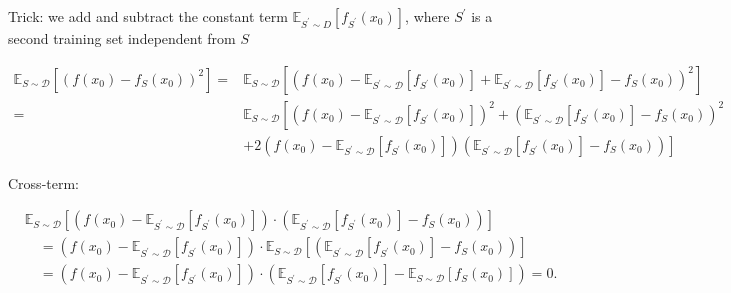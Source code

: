 Trick: we add and subtract the constant term $\mathbb{E}_{S^{\prime} \sim D}\left[f_{S^{\prime}}\left(x_{0}\right)\right]$, where $S^{\prime}$ is a second training set independent from $S$

$$
\begin{aligned}
\mathbb{E}_{S \sim \mathscr{D}}\left[\left(f\left(x_{0}\right)-f_{S}\left(x_{0}\right)\right)^{2}\right]= & \mathbb{E}_{S \sim \mathscr{D}}\left[\left(f\left(x_{0}\right)-\mathbb{E}_{S^{\prime} \sim \mathscr{D}}\left[f_{S^{\prime}}\left(x_{0}\right)\right]+\mathbb{E}_{S^{\prime} \sim \mathscr{D}}\left[f_{S^{\prime}}\left(x_{0}\right)\right]-f_{S}\left(x_{0}\right)\right)^{2}\right] \\
= & \mathbb{E}_{S \sim \mathscr{D}}\left[\left(f\left(x_{0}\right)-\mathbb{E}_{S^{\prime} \sim \mathcal{D}}\left[f_{S^{\prime}}\left(x_{0}\right)\right]\right)^{2}+\left(\mathbb{E}_{S^{\prime} \sim \mathscr{D}}\left[f_{S^{\prime}}\left(x_{0}\right)\right]-f_{S}\left(x_{0}\right)\right)^{2}\right. \\
& \left.+2\left(f\left(x_{0}\right)-\mathbb{E}_{S^{\prime} \sim \mathscr{D}}\left[f_{S^{\prime}}\left(x_{0}\right)\right]\right)\left(\mathbb{E}_{S^{\prime} \sim \mathscr{D}}\left[f_{S^{\prime}}\left(x_{0}\right)\right]-f_{S}\left(x_{0}\right)\right)\right]
\end{aligned}
$$

Cross-term:

$$
\begin{aligned}
& \mathbb{E}_{S \sim \mathscr{D}} {\left[\left(f\left(x_{0}\right)-\mathbb{E}_{S^{\prime} \sim \mathscr{D}}\left[f_{S^{\prime}}\left(x_{0}\right)\right]\right) \cdot\left(\mathbb{E}_{S^{\prime} \sim \mathscr{D}}\left[f_{S^{\prime}}\left(x_{0}\right)\right]-f_{S}\left(x_{0}\right)\right)\right] } \\
& \quad=\left(f\left(x_{0}\right)-\mathbb{E}_{S^{\prime} \sim \mathscr{D}}\left[f_{S^{\prime}}\left(x_{0}\right)\right]\right) \cdot \mathbb{E}_{S \sim \mathscr{D}}\left[\left(\mathbb{E}_{S^{\prime} \sim \mathscr{D}}\left[f_{S^{\prime}}\left(x_{0}\right)\right]-f_{S}\left(x_{0}\right)\right)\right] \\
& \quad=\left(f\left(x_{0}\right)-\mathbb{E}_{S^{\prime} \sim \mathscr{D}}\left[f_{S^{\prime}}\left(x_{0}\right)\right]\right) \cdot\left(\mathbb{E}_{S^{\prime} \sim \mathcal{D}}\left[f_{S^{\prime}}\left(x_{0}\right)\right]-\mathbb{E}_{S \sim \mathscr{D}}\left[f_{S}\left(x_{0}\right)\right]\right)=0 .
\end{aligned}
$$

